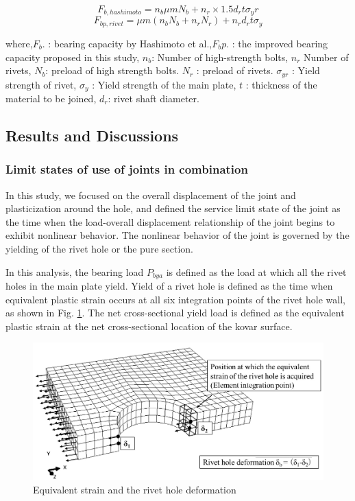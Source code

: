 \begin{equation}\label{eq-fbhashi}
    F_{b,hashimoto}=n_b μmN_b + n_r \times 1.5d_r tσ_yr
\end{equation}
\begin{equation}
    F_{bp,rivet}=μm(n_b N_b+n_r N_r)+n_r d_r tσ_y
\end{equation}

where,$F_b.$ : bearing capacity by Hashimoto et al.,$F_bp$. : the improved bearing capacity proposed in this study, $n_b$: Number of high-strength bolts, $n_r$ Number of rivets, $N_b$: preload of high strength bolts. $N_r$ : preload of rivets. $\sigma_{yr}$ : Yield strength of rivet, $σ_y$ : Yield strength of the main plate, $t$ : thickness of the material to be joined, $d_r$: rivet shaft diameter.

\subsection{Results and Discussions}

\subsubsection{Limit states of use of joints in combination}

In this study, we focused on the overall displacement of the joint and plasticization around the hole, and defined the service limit state of the joint as the time when the load-overall displacement relationship of the joint begins to exhibit nonlinear behavior. The nonlinear behavior of the joint is governed by the yielding of the rivet hole or the pure section.

In this analysis, the bearing load $P_{bya}$ is defined as the load at which all the rivet holes in the main plate yield. Yield of a rivet hole is defined as the time when equivalent plastic strain occurs at all six integration points of the rivet hole wall, as shown in Fig. \ref{fig-posieqqe}. The net cross-sectional yield load is defined as the equivalent plastic strain at the net cross-sectional location of the kovar surface.

\begin{figure}[htbp]
    \centering
    \includegraphics[width=0.75\linewidth]{imgs//ch4/posi-eqqe.pdf}
    \caption{Equivalent strain and the rivet hole deformation}
    \label{fig-posieqqe}
\end{figure}

